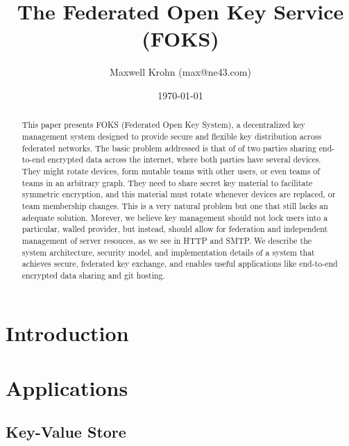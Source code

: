 \documentclass[11pt]{article}
\title{The Federated Open Key Service (FOKS)}
\author{Maxwell Krohn (max@ne43.com)}
\date{\today}
\begin{document}
\newcommand{\yubi}{Yubikey}
\newcommand{\Yubi}{Yubikey}
\newcommand{\yubis}{Yubikeys}
\newcommand{\Yubis}{Yubikeys}

\maketitle

\begin{abstract}

This paper presents FOKS (Federated Open Key System), a
decentralized key management system designed to provide secure and flexible key
distribution across federated networks. The basic problem addressed is that of
of two parties sharing end-to-end encrypted data across the internet, where both
parties have several devices. They might rotate devices, form mutable teams with
other users, or even teams of teams in an arbitrary graph. They need to share
secret key material to facilitate symmetric encryption, and this material must
rotate whenever devices are replaced, or team membership changes.  This is a
very natural problem but one that still lacks an adequate solution.  Morever, we
believe key management should not lock users into a particular, walled provider,
but instead, should allow for federation and independent management of server
resouces, as we see in HTTP and SMTP.  We describe the system architecture,
security model, and implementation details of a system that achieves secure,
federated key exchange, and enables useful applications like end-to-end
encrypted data sharing and git hosting.

\end{abstract}


\section{Introduction}







\section{Applications}

\subsection{Key-Value Store}
\end{document}
